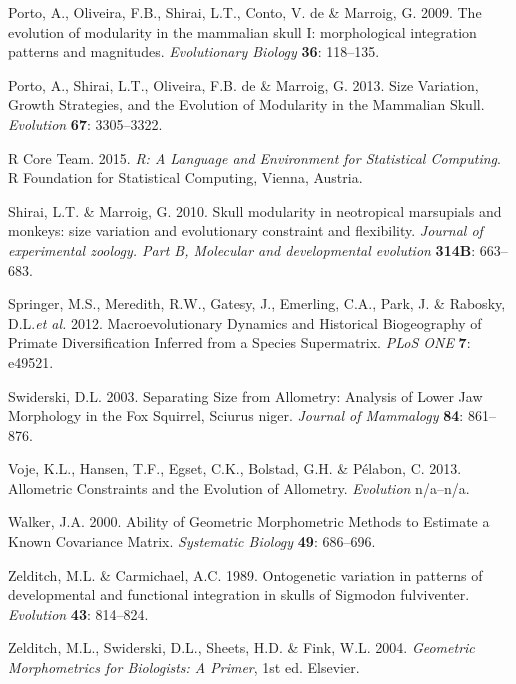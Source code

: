 \documentclass[12pt,]{article}
\begin{document}
Porto, A., Oliveira, F.B., Shirai, L.T., Conto, V. de \& Marroig, G.
2009. The evolution of modularity in the mammalian skull I:
morphological integration patterns and magnitudes. \emph{Evolutionary
Biology} \textbf{36}: 118--135.

Porto, A., Shirai, L.T., Oliveira, F.B. de \& Marroig, G. 2013. Size
Variation, Growth Strategies, and the Evolution of Modularity in the
Mammalian Skull. \emph{Evolution} \textbf{67}: 3305--3322.

R Core Team. 2015. \emph{R: A Language and Environment for Statistical
Computing}. R Foundation for Statistical Computing, Vienna, Austria.

Shirai, L.T. \& Marroig, G. 2010. Skull modularity in neotropical
marsupials and monkeys: size variation and evolutionary constraint and
flexibility. \emph{Journal of experimental zoology. Part B, Molecular
and developmental evolution} \textbf{314B}: 663--683.

Springer, M.S., Meredith, R.W., Gatesy, J., Emerling, C.A., Park, J. \&
Rabosky, D.L.\emph{et al.} 2012. Macroevolutionary Dynamics and
Historical Biogeography of Primate Diversification Inferred from a
Species Supermatrix. \emph{PLoS ONE} \textbf{7}: e49521.

Swiderski, D.L. 2003. Separating Size from Allometry: Analysis of Lower
Jaw Morphology in the Fox Squirrel, Sciurus niger. \emph{Journal of
Mammalogy} \textbf{84}: 861--876.

Voje, K.L., Hansen, T.F., Egset, C.K., Bolstad, G.H. \& Pélabon, C.
2013. Allometric Constraints and the Evolution of Allometry.
\emph{Evolution} n/a--n/a.

Walker, J.A. 2000. Ability of Geometric Morphometric Methods to Estimate
a Known Covariance Matrix. \emph{Systematic Biology} \textbf{49}:
686--696.

Zelditch, M.L. \& Carmichael, A.C. 1989. Ontogenetic variation in
patterns of developmental and functional integration in skulls of
Sigmodon fulviventer. \emph{Evolution} \textbf{43}: 814--824.

Zelditch, M.L., Swiderski, D.L., Sheets, H.D. \& Fink, W.L. 2004.
\emph{Geometric Morphometrics for Biologists: A Primer}, 1st ed.
Elsevier.
\end{document}
